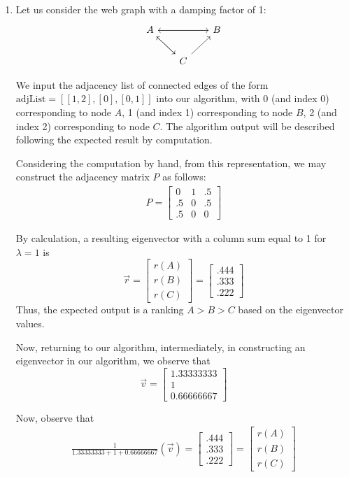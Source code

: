 \documentclass{article}
\begin{document}
    \begin{enumerate}
        \item Let us consider the web graph with a damping factor of 1: 
        $$
        \begin{tikzcd}[column sep=scriptsize]
            A \arrow[dr] \arrow[rr]{}
            & & B \arrow[ll] \\
            & C \arrow[ur] \arrow[ul]
        \end{tikzcd}
        $$
        
        We input the adjacency list of connected edges of the form $\text{adjList} = [[1, 2],[0],[0, 1]]$ into our algorithm, with 0 (and index 0) corresponding to node $A$, 1 (and index 1) corresponding to node $B$, 2 (and index 2) corresponding to node $C$. The algorithm output will be described following the expected result by computation.
        
        Considering the computation by hand, from this representation, we may construct the adjacency matrix $P$ as follows:
        \begin{align*}
            P = \begin{bmatrix} 0 & 1 & .5 \\ .5 & 0 & .5 \\ .5 & 0 & 0 \end{bmatrix}
        \end{align*}
        
        By calculation, a resulting eigenvector with a column sum equal to 1 for $\lambda = 1$ is $$\vec{r} = \begin{bmatrix} r(A) \\ r(B) \\ r(C) \end{bmatrix} = \begin{bmatrix} .444 \\ .333 \\ .222 \end{bmatrix}$$
        Thus, the expected output is a ranking $A > B > C$ based on the eigenvector values.
        
        Now, returning to our algorithm, intermediately, in constructing an eigenvector in our algorithm, we observe that $$\vec{v}  = \begin{bmatrix} 1.33333333 \\ 1 \\ 0.66666667 \end{bmatrix}$$
        
        Now, observe that 
        \begin{align*}
            \frac{1}{1.33333333 + 1 + 0.66666667}(\vec{v}) = \begin{bmatrix} .444 \\ .333 \\ .222  \end{bmatrix} = \begin{bmatrix} r(A) \\ r(B) \\ r(C)  \end{bmatrix}
        \end{align*}
        

\end{enumerate}
\end{document}
